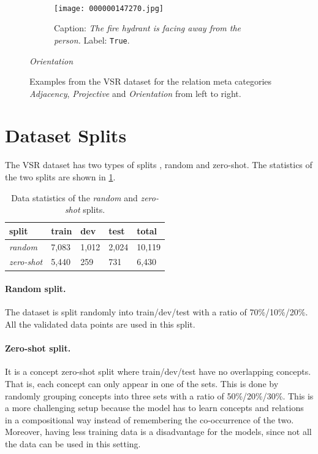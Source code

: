 \begin{figure}[ht]
\begin{minipage}[t]{.30\textwidth}
\begin{subfigure}[t]{\textwidth}
        \label{fig:hair_drier_facing}
        \end{subfigure}\\
        \begin{subfigure}[t]{\textwidth}
        \centering
        \texttt{[image: 000000147270.jpg]}
        \caption{Caption: \textit{The fire hydrant is facing away from the person.} Label: \texttt{True}.}
        \label{fig:fire_hydrant_has_face}
        \end{subfigure}%
        \caption*{\textit{Orientation}}
    \end{minipage}%
    \caption{Examples from the VSR dataset for the relation meta categories \textit{Adjacency}, \textit{Projective} and \textit{Orientation} from left to right.}
    \label{fig:vsr-examples-2}
\end{figure}

\section{Dataset Splits} \label{sec:vsr_splits}

The VSR dataset has two types of splits \cite{liu2022visual}, random and zero-shot. The statistics of the two splits are shown in \cref{tab:data_splits}.

\begin{table}[ht]
\small
\centering
\begin{tabular}{lllll}
\toprule
 split & train & dev & test & total   \\
\midrule
\textit{random} & 7,083 & 1,012 & 2,024 & 10,119 \\
\textit{zero-shot} & 5,440 & 259 & 731  & 6,430\\
\bottomrule
\end{tabular}
\caption{Data statistics of the \textit{random} and \textit{zero-shot} splits. }
\label{tab:data_splits}
\end{table}

\paragraph{Random split.}
The dataset is split randomly into train/dev/test with a ratio of 70\%/10\%/20\%. All the validated data points are used in this split.

\paragraph{Zero-shot split.}
It is a concept zero-shot split where train/dev/test have no overlapping concepts. That is, each concept can only appear in one of the sets.
This is done by randomly grouping concepts into three sets with a ratio of 50\%/20\%/30\%.
This is a more challenging setup because the model has to learn concepts and relations in a compositional way instead of remembering the co-occurrence of the two.
Moreover, having less training data is a disadvantage for the models, since not all the data can be used in this setting.

